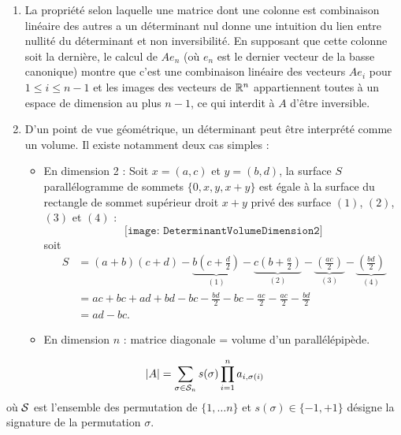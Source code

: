 \remarks 
\begin{enumerate}
 \item La propriété selon laquelle une matrice dont une colonne est combinaison linéaire des autres a un déterminant nul donne une intuition du lien entre nullité du déterminant et non inversibilité. En supposant que cette colonne soit la dernière, le calcul de $A e_n$ (où $e_n$ est le dernier vecteur de la basse canonique) montre que c'est une combinaison linéaire des vecteurs $A e_i$ pour $1 \leq i \leq n-1$ et les images des vecteurs de $\mathbb{R}^n$ appartiennent toutes à un espace de dimension au plus $n-1$, ce qui interdit à $A$ d'être inversible.
  \item D'un point de vue géométrique, un déterminant peut être interprété comme un volume. Il existe notamment deux cas simples :
  \begin{itemize}
  \item En dimension 2 : 
    Soit $x = (a, c)$ et $y = (b, d)$, la surface $S$ parallélogramme de sommets $\{0, x, y, x+y\}$ est égale à la surface du rectangle de sommet supérieur droit $x+y$ privé des surface $(1)$, $(2)$, $(3)$ et $(4)$ : 
    $$
    \texttt{[image: DeterminantVolumeDimension2]}
    $$
    soit
    \begin{align*}
      S 
      & = (a+b)(c+d) 
      - \underset{(1)}{\underbrace{b\left(c + \frac{d}2\right)}} 
      - \underset{(2)}{\underbrace{c\left(b + \frac{a}2\right)}} 
      - \underset{(3)}{\underbrace{\left(\frac{ac}2\right)}} 
      - \underset{(4)}{\underbrace{\left(\frac{bd}2\right)}} \\
      & = ac + bc + ad + bd - bc - \frac{bd}2 - bc - \frac{ac}2 - \frac{ac}2 - \frac{bd}2 \\
      & = ad - bc.
    \end{align*}
  \item En dimension $n$ : matrice diagonale = volume d'un parallélépipède.
  \end{itemize}
\end{enumerate}


\begin{proposition} \label{prop:formuleGeneraleDeterminant}
  \begin{equation} \label{eq:determinant}
    |A| = \sum_{\sigma \in \mathcal{S}_n} s(\sigma) \prod_{i=1}^n a_{i, \sigma(i)} 
    \end{equation}
    où $\mathcal{S}$ est l'ensemble des permutation de $\{1, \dots n\}$ et $s(\sigma) \in \{-1, +1\}$ désigne la signature de la permutation $\sigma$. 
\end{proposition}

